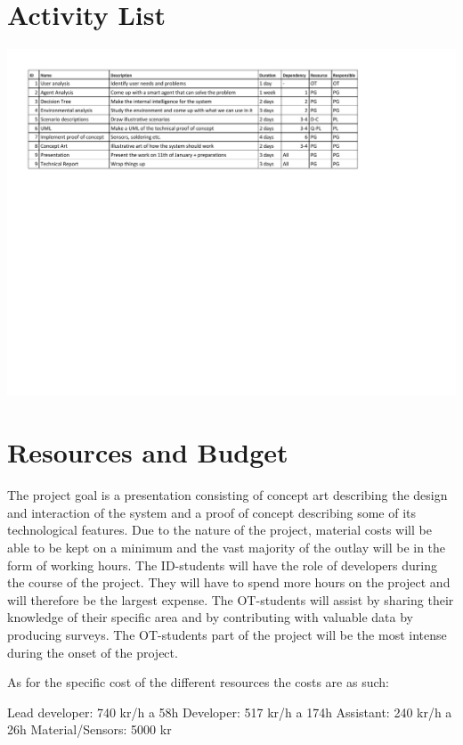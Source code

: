 \documentclass[twoside]{report}
\begin{document}
\section{Activity List}
\includegraphics[scale=0.9]{graphics/activity.pdf} 

\section{Resources and Budget}
The project goal is a presentation consisting of concept art describing the
design and interaction of the system and a proof of concept describing some of
its technological features. Due to the nature of the project, material costs
will be able to be kept on a minimum and the vast majority of the outlay will be
in the form of working hours. The ID-students will have the role of developers
during the course of the project. They will have to spend more hours on the
project and will therefore be the largest expense. The OT-students will assist
by sharing their knowledge of their specific area and by contributing with
valuable data by producing surveys. The OT-students part of the project will be
the most intense during the onset of the project. 

As for the specific cost of the different resources the costs are as such:

Lead developer: 740 kr/h a 58h
Developer: 517 kr/h a 174h
Assistant: 240 kr/h a 26h
Material/Sensors: 5000 kr


\end{document}
